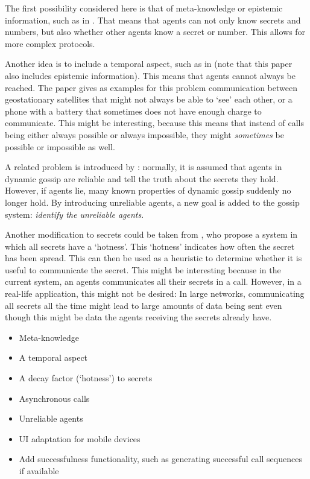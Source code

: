 The first possibility considered here is that of meta-knowledge or epistemic information, such as in \textcite{herzig_how_2017}.
That means that agents can not only know secrets and numbers, 
but also whether other agents know a secret or number.
This allows for more complex protocols.

Another idea is to include a temporal aspect, such as in \textcite{slavkovik_temporal_2019}
(note that this paper also includes epistemic information).
This means that agents cannot always be reached.
The paper gives as examples for this problem communication between geostationary satellites that might not always be able to `see' each other,
or a phone with a battery that sometimes does not have enough charge to communicate.
This might be interesting, because this means that instead of calls being either always possible or always impossible, 
they might \textit{sometimes} be possible or impossible as well.

A related problem is introduced by \textcite{van_den_berg_unreliable_2018}: 
normally, it is assumed that agents in dynamic gossip are reliable and tell the truth about the secrets they hold.
However, if agents lie, many known properties of dynamic gossip suddenly no longer hold.
By introducing unreliable agents, a new goal is added to the gossip system:
\textit{identify the unreliable agents}.

Another modification to secrets could be taken from \textcite{demers_epidemic_1988}, who propose a system in which all secrets have a `hotness'.
This `hotness' indicates how often the secret has been spread.
This can then be used as a heuristic to determine whether it is useful to communicate the secret.
This might be interesting because in the current system, an agents communicates all their secrets in a call.
However, in a real-life application, this might not be desired:
In large networks, communicating all secrets all the time might lead to large amounts of data being sent even though this might be data the agents receiving the secrets already have.

\begin{itemize}
    \item Meta-knowledge \parencite{herzig_how_2017}
    \item A temporal aspect \parencite[also includes meta-knowledge]{slavkovik_temporal_2019}
    \item A decay factor (`hotness') to secrets \parencite{demers_epidemic_1988}
    \item Asynchronous calls \addcite
    \item Unreliable agents \parencite{van_den_berg_unreliable_2018}
    \item UI adaptation for mobile devices
    \item Add successfulness functionality, such as generating successful call sequences if available
\end{itemize}
